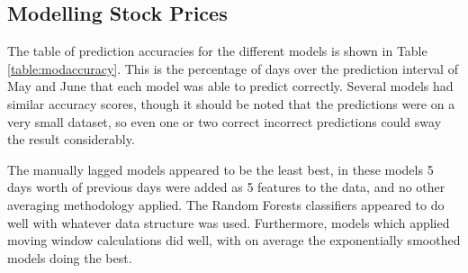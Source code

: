 \subsection{Modelling Stock Prices}
The table of prediction accuracies for the different models is shown in Table \ref{table:modaccuracy}. This is the percentage of days over the prediction interval of May and June that each model was able to predict correctly. Several models had similar accuracy scores, though it should be noted that the predictions were on a very small dataset, so even one or two correct incorrect predictions could sway the result considerably. 

The manually lagged models appeared to be the least best, in these models 5 days worth of previous days were added as 5 features to the data, and no other averaging methodology applied. The Random Forests classifiers appeared to do well with whatever data structure was used. Furthermore, models which applied moving window calculations did well, with on average the exponentially smoothed models doing the best.

